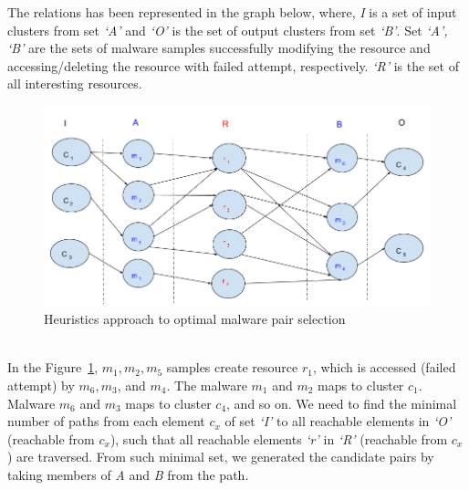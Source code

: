 The relations has been represented in the graph below, where, \emph{I} is a set of input clusters from set \emph{`A'} and \emph{`O'} is the set of output clusters from set \emph{`B'}.
Set \emph{`A', `B'} are the sets of malware samples successfully modifying the resource and accessing/deleting the resource with failed attempt, respectively.
\emph{`R'} is the set of all interesting resources.
\begin{figure}[htbp]
  \centering
  \includegraphics[scale=0.45]{figures/dhkheuristics.png}
  \caption[]{Heuristics approach to optimal malware pair selection}\label{fig:dhkheuristics}
\end{figure}
\\

In the Figure~\ref{fig:dhkheuristics},  $m_1,m_2, m_5$ samples create resource $r_1$, which is accessed (failed attempt) by $m_6, m_3$, and $m_4$.
The malware $m_1$ and $m_2$ maps to cluster $c_1$. Malware $m_6$ and $m_3$ maps to cluster $c_4$, and so on.
We need to find the minimal number of paths from each element \emph{$c_x$} of set \emph{`I'} to all reachable elements in \emph{`O'} (reachable from \emph{$c_x$}), such that all reachable elements \emph{`r'} in \emph{`R'} (reachable from \emph{$c_x$}) are traversed.
From such minimal set, we generated the candidate pairs by taking members of \emph{A} and \emph{B} from the path.
\\

